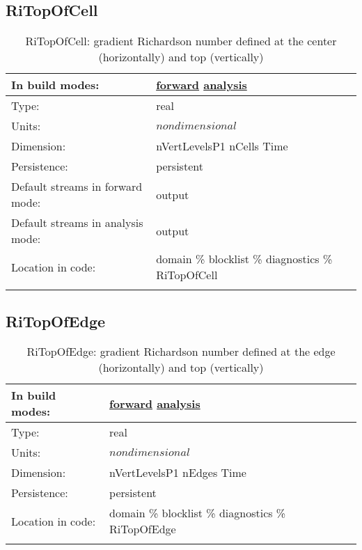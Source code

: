 \subsection[RiTopOfCell]{RiTopOfCell}
\label{subsec:var_sec_diagnostics_RiTopOfCell}
\begin{center}
\begin{longtable}{| p{2.0in} | p{4.0in} |}
        \hline 
        In build modes: & \hyperref[subsec:forward_var_tab_diagnostics]{forward} \hyperref[subsec:analysis_var_tab_diagnostics]{analysis} \\
        \hline 
        Type: & real \\
        \hline 
        Units: & $nondimensional$ \\
        \hline 
        Dimension: & nVertLevelsP1 nCells Time \\
        \hline 
        Persistence: & persistent \\
        \hline 
		 Default streams in forward mode: &  output \\
        \hline 
		 Default streams in analysis mode: &  output \\
        \hline 
		 Location in code: & domain \% blocklist \% diagnostics \% RiTopOfCell \\
		 \hline 
    \caption{RiTopOfCell: gradient Richardson number defined at the center (horizontally) and top (vertically)}
\end{longtable}
\end{center}
\subsection[RiTopOfEdge]{RiTopOfEdge}
\label{subsec:var_sec_diagnostics_RiTopOfEdge}
\begin{center}
\begin{longtable}{| p{2.0in} | p{4.0in} |}
        \hline 
        In build modes: & \hyperref[subsec:forward_var_tab_diagnostics]{forward} \hyperref[subsec:analysis_var_tab_diagnostics]{analysis} \\
        \hline 
        Type: & real \\
        \hline 
        Units: & $nondimensional$ \\
        \hline 
        Dimension: & nVertLevelsP1 nEdges Time \\
        \hline 
        Persistence: & persistent \\
        \hline 
		 Location in code: & domain \% blocklist \% diagnostics \% RiTopOfEdge \\
		 \hline 
    \caption{RiTopOfEdge: gradient Richardson number defined at the edge (horizontally) and top (vertically)}
\end{longtable}
\end{center}
